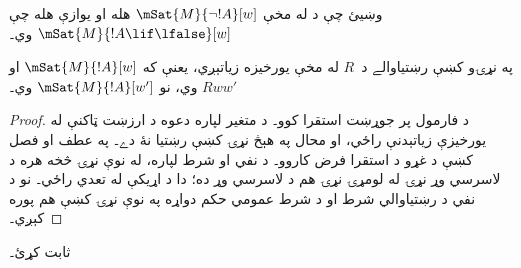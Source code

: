 \documentclass[../../../include/open-logic-section]{subfiles}
\begin{document}
\begin{prob}
  وښيئ چې د  له مخې
  $\mSat{M}{\lnot !A}[w]$ هله او يوازې هله چې
  $\mSat{M}{!A \lif \lfalse}[w]$ وي۔
\end{prob}

\begin{prop}
  په نړۍو کښې رښتياوالے د~$R$ له مخې يورخيزه زياتېږي، يعنې که
  $\mSat{M}{!A}[w]$ او $Rww'$ وي، نو $\mSat{M}{!A}[w']$ وي۔
\end{prop}

\begin{proof}
  د فارمول پر جوړښت استقرا کوو۔ د متغير لپاره دعوه د ارزښت
  ټاکنې له يورخيزې زياتېدنې راځي، او محال په هېڅ نړۍ کښې
  رښتيا نۀ دے۔ په عطف او فصل کښې د غړو د استقرا فرض کاروو۔
  د نفي او شرط لپاره، له نوې نړۍ څخه هره د لاسرسي وړ نړۍ له
  لومړۍ نړۍ هم د لاسرسي وړ ده؛ دا د اړيکې له تعدي راځي۔ نو
  د نفي د رښتياوالي شرط او د شرط عمومي حکم دواړه په نوې نړۍ کښې
  هم پوره کېږي۔
\end{proof}

\begin{prob}
   ثابت کړئ۔
\end{prob}
\end{document}
